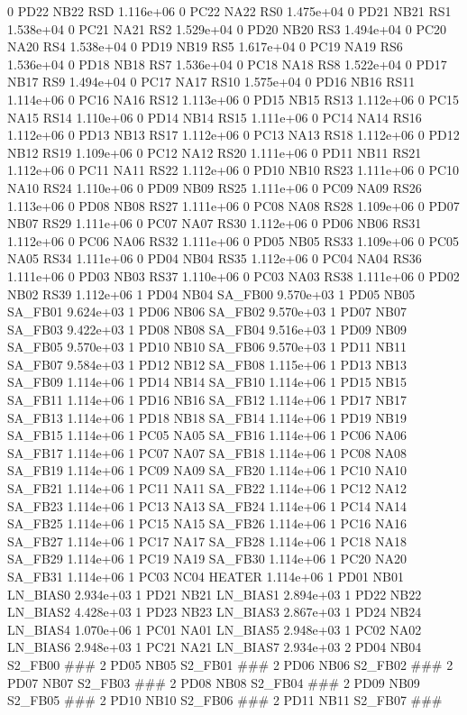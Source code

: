 0 PD22 NB22 RSD 1.116e+06 
0 PC22 NA22 RS0 1.475e+04 
0 PD21 NB21 RS1 1.538e+04 
0 PC21 NA21 RS2 1.529e+04 
0 PD20 NB20 RS3 1.494e+04 
0 PC20 NA20 RS4 1.538e+04 
0 PD19 NB19 RS5 1.617e+04 
0 PC19 NA19 RS6 1.536e+04 
0 PD18 NB18 RS7 1.536e+04 
0 PC18 NA18 RS8 1.522e+04 
0 PD17 NB17 RS9 1.494e+04 
0 PC17 NA17 RS10 1.575e+04 
0 PD16 NB16 RS11 1.114e+06 
0 PC16 NA16 RS12 1.113e+06 
0 PD15 NB15 RS13 1.112e+06 
0 PC15 NA15 RS14 1.110e+06 
0 PD14 NB14 RS15 1.111e+06 
0 PC14 NA14 RS16 1.112e+06 
0 PD13 NB13 RS17 1.112e+06 
0 PC13 NA13 RS18 1.112e+06 
0 PD12 NB12 RS19 1.109e+06 
0 PC12 NA12 RS20 1.111e+06 
0 PD11 NB11 RS21 1.112e+06 
0 PC11 NA11 RS22 1.112e+06 
0 PD10 NB10 RS23 1.111e+06 
0 PC10 NA10 RS24 1.110e+06 
0 PD09 NB09 RS25 1.111e+06 
0 PC09 NA09 RS26 1.113e+06 
0 PD08 NB08 RS27 1.111e+06 
0 PC08 NA08 RS28 1.109e+06 
0 PD07 NB07 RS29 1.111e+06 
0 PC07 NA07 RS30 1.112e+06 
0 PD06 NB06 RS31 1.112e+06 
0 PC06 NA06 RS32 1.111e+06 
0 PD05 NB05 RS33 1.109e+06 
0 PC05 NA05 RS34 1.111e+06 
0 PD04 NB04 RS35 1.112e+06 
0 PC04 NA04 RS36 1.111e+06 
0 PD03 NB03 RS37 1.110e+06 
0 PC03 NA03 RS38 1.111e+06 
0 PD02 NB02 RS39 1.112e+06 
1 PD04 NB04 SA_FB00 9.570e+03 
1 PD05 NB05 SA_FB01 9.624e+03 
1 PD06 NB06 SA_FB02 9.570e+03 
1 PD07 NB07 SA_FB03 9.422e+03 
1 PD08 NB08 SA_FB04 9.516e+03 
1 PD09 NB09 SA_FB05 9.570e+03 
1 PD10 NB10 SA_FB06 9.570e+03 
1 PD11 NB11 SA_FB07 9.584e+03 
1 PD12 NB12 SA_FB08 1.115e+06 
1 PD13 NB13 SA_FB09 1.114e+06 
1 PD14 NB14 SA_FB10 1.114e+06 
1 PD15 NB15 SA_FB11 1.114e+06 
1 PD16 NB16 SA_FB12 1.114e+06 
1 PD17 NB17 SA_FB13 1.114e+06 
1 PD18 NB18 SA_FB14 1.114e+06 
1 PD19 NB19 SA_FB15 1.114e+06 
1 PC05 NA05 SA_FB16 1.114e+06 
1 PC06 NA06 SA_FB17 1.114e+06 
1 PC07 NA07 SA_FB18 1.114e+06 
1 PC08 NA08 SA_FB19 1.114e+06 
1 PC09 NA09 SA_FB20 1.114e+06 
1 PC10 NA10 SA_FB21 1.114e+06 
1 PC11 NA11 SA_FB22 1.114e+06 
1 PC12 NA12 SA_FB23 1.114e+06 
1 PC13 NA13 SA_FB24 1.114e+06 
1 PC14 NA14 SA_FB25 1.114e+06 
1 PC15 NA15 SA_FB26 1.114e+06 
1 PC16 NA16 SA_FB27 1.114e+06 
1 PC17 NA17 SA_FB28 1.114e+06 
1 PC18 NA18 SA_FB29 1.114e+06 
1 PC19 NA19 SA_FB30 1.114e+06 
1 PC20 NA20 SA_FB31 1.114e+06 
1 PC03 NC04 HEATER 1.114e+06 
1 PD01 NB01 LN_BIAS0 2.934e+03 
1 PD21 NB21 LN_BIAS1 2.894e+03 
1 PD22 NB22 LN_BIAS2 4.428e+03 
1 PD23 NB23 LN_BIAS3 2.867e+03 
1 PD24 NB24 LN_BIAS4 1.070e+06 
1 PC01 NA01 LN_BIAS5 2.948e+03 
1 PC02 NA02 LN_BIAS6 2.948e+03 
1 PC21 NA21 LN_BIAS7 2.934e+03 
2 PD04 NB04 S2_FB00 ### 
2 PD05 NB05 S2_FB01 ### 
2 PD06 NB06 S2_FB02 ### 
2 PD07 NB07 S2_FB03 ### 
2 PD08 NB08 S2_FB04 ### 
2 PD09 NB09 S2_FB05 ### 
2 PD10 NB10 S2_FB06 ### 
2 PD11 NB11 S2_FB07 ### 

